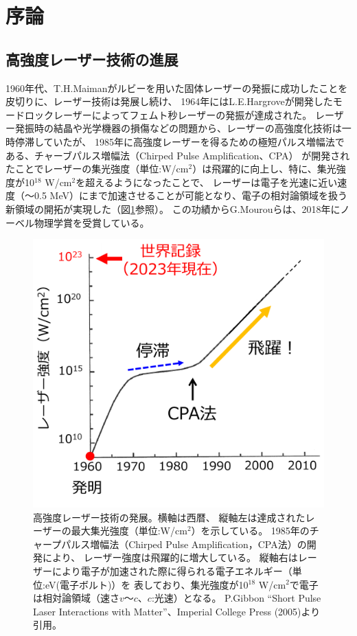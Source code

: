 \documentclass[a4paper,11pt,titlepage]{jsarticle}
\begin{document}
  \section{序論}
  \subsection{高強度レーザー技術の進展}

  1960年代、T.H.Maimanがルビーを用いた固体レーザーの発振に成功した\cite{ft1}ことを皮切りに、レーザー技術は発展し続け、
  1964年にはL.E.Hargroveが開発したモードロックレーザーによってフェムト秒レーザーの発振が達成された\cite{ft2}。
  レーザー発振時の結晶や光学機器の損傷などの問題から、レーザーの高強度化技術は一時停滞していたが、
  1985年に高強度レーザーを得るための極短パルス増幅法である、チャーブパルス増幅法（Chirped Pulse Amplification、CPA）\cite{ft3}
  が開発されたことでレーザーの集光強度（単位:W/cm$^{2}$）は飛躍的に向上し、特に、集光強度が10$^{18}$ W/cm$^{2}$を超えるようになったことで、
  レーザーは電子を光速に近い速度（～0.5 MeV）にまで加速させることが可能となり、電子の相対論領域を扱う新領域の開拓が実現した（図\ref{fig:1}参照）。
  この功績からG.Mourouらは、2018年にノーベル物理学賞を受賞している。

  \begin{figure}[H]
    \begin{center}
      \includegraphics[scale=0.4]{./image/1-laser.png}
      \caption{
        \label{fig:1}
        高強度レーザー技術の発展。横軸は西暦、
        縦軸左は達成されたレーザーの最大集光強度（単位:W/cm$^2$）を示している。
        1985年のチャープパルス増幅法（Chirped Pulse Amplification，CPA法）の開発により、
        レーザー強度は飛躍的に増大している。
        縦軸右はレーザーにより電子が加速された際に得られる電子エネルギー（単位:eV(電子ボルト)）を
        表しており、集光強度が10$^{18}$ W/cm$^{2}$で電子は相対論領域（速さ$v$～$c$、$c$:光速）となる。
        P.Gibbon “Short Pulse Laser Interactions with Matter”、Imperial College Press (2005)より引用。
      }
    \end{center}
  \end{figure}
\end{document}
